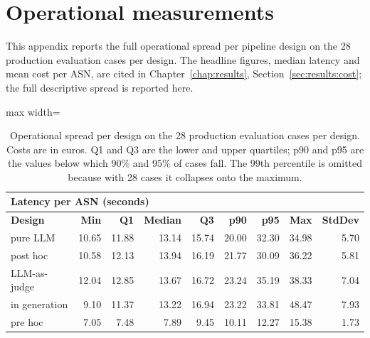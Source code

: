 \chapter{Operational measurements}
\label{app:operational}

This appendix reports the full operational spread per pipeline design on the 28 production evaluation cases per design. The headline figures, median latency and mean cost per ASN, are cited in Chapter~\ref{chap:results}, Section~\ref{sec:results:cost}; the full descriptive spread is reported here.

\begin{table}[htbp]
\centering
\caption{Operational spread per design on the 28 production evaluation cases per design. Costs are in euros. Q1 and Q3 are the lower and upper quartiles; p90 and p95 are the values below which 90\% and 95\% of cases fall. The 99th percentile is omitted because with 28 cases it collapses onto the maximum.}
\label{tab:app:operational}
\footnotesize
\setlength{\tabcolsep}{4pt}

\begin{adjustbox}{max width=\textwidth}
\begin{tabular}{@{}lrrrrrrrr@{}}
\multicolumn{9}{l}{\textbf{Latency per ASN (seconds)}} \\
\toprule
\textbf{Design} & \textbf{Min} & \textbf{Q1} & \textbf{Median} & \textbf{Q3} & \textbf{p90} & \textbf{p95} & \textbf{Max} & \textbf{StdDev} \\
\midrule
pure LLM      & 10.65 & 11.88 & 13.14 & 15.74 & 20.00 & 32.30 & 34.98 & 5.70 \\
post hoc      & 10.58 & 12.13 & 13.94 & 16.19 & 21.77 & 30.09 & 36.22 & 5.81 \\
LLM-as-judge  & 12.04 & 12.85 & 13.67 & 16.72 & 23.24 & 35.19 & 38.33 & 7.04 \\
in generation & 9.10  & 11.37 & 13.22 & 16.94 & 23.22 & 33.81 & 48.47 & 7.93 \\
pre hoc       & 7.05  & 7.48  & 7.89  & 9.45  & 10.11 & 12.27 & 15.38 & 1.73 \\
\bottomrule
\end{tabular}
\end{adjustbox}

\medskip


\end{table}
